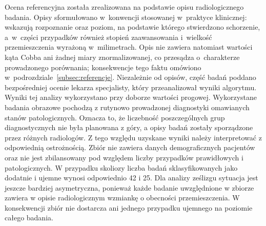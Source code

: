 Ocena referencyjna została zrealizowana na podstawie opisu radiologicznego badania.
Opisy sformułowano w~konwencji stosowanej w~praktyce klinicznej: wskazują rozpoznanie oraz poziom, na podstawie którego stwierdzono schorzenie, a~w~części przypadków również stopień zaawansowania i~wielkość przemieszczenia wyrażoną w~milimetrach.
Opis nie zawiera natomiast wartości kąta Cobba ani żadnej miary znormalizowanej, co przesądza o~charakterze prowadzonego porównania; konsekwencje tego faktu omówiono w~podrozdziale~\ref{subsec:referencje}.
Niezależnie od opisów, część badań poddano bezpośredniej ocenie lekarza specjalisty, który przeanalizował wyniki algorytmu. Wyniki tej analizy wykorzystano przy doborze wartości progowej.
Wykorzystane badania obrazowe pochodzą z rutynowo prowadzonej diagnostyki omawianych stanów patologicznych. Oznacza to, że liczebność poszczególnych grup diagnostycznych nie była planowana z góry, a opisy badań zostały sporządzone przez różnych radiologów. Z tego względu uzyskane wyniki należy interpretować z odpowiednią ostrożnością.
Zbiór nie zawiera danych demograficznych pacjentów oraz nie jest zbilansowany pod względem liczby przypadków prawidłowych i patologicznych. W przypadku skoliozy liczba badań sklasyfikowanych jako dodatnie i ujemne wynosi odpowiednio 42 i 25. Dla analizy ześlizgu sytuacja jest jeszcze bardziej asymetryczna, ponieważ każde badanie uwzględnione w zbiorze zawiera w opisie radiologicznym wzmiankę o obecności przemieszczenia. W konsekwencji zbiór nie dostarcza ani jednego przypadku ujemnego na poziomie całego badania.


